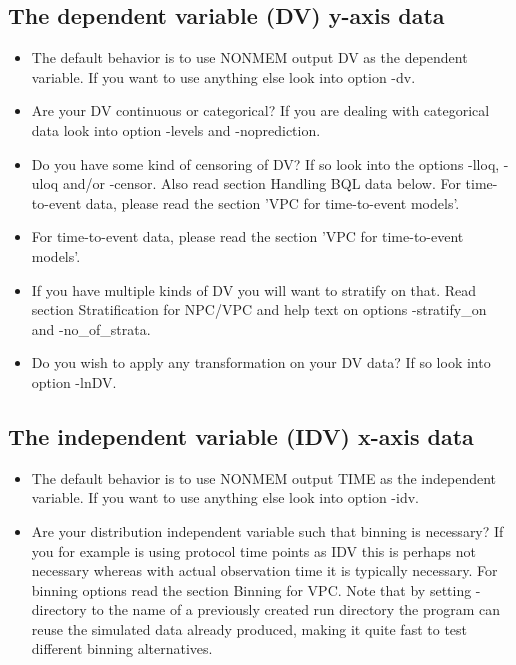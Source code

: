 \subsection{The dependent variable (DV) y-axis data}

\begin{itemize}
	\item The default behavior is to use NONMEM output DV as the dependent variable. If you want to use anything else look into option -dv.
	\item Are your DV continuous or categorical? If you are dealing with categorical data look into option -levels and -noprediction.
	\item Do you have some kind of censoring of DV? If so look into the options -lloq, -uloq and/or -censor. Also read section Handling BQL data below. For time-to-event data, please read the section 'VPC for time-to-event models'.
	\item For time-to-event data, please read the section 'VPC for time-to-event models'.
	\item If you have multiple kinds of DV you will want to stratify on that. Read section Stratification for NPC/VPC and help text on options -stratify\_on and -no\_of\_strata.
	\item Do you wish to apply any transformation on your DV data? If so look into option -lnDV.
\end{itemize}

\subsection{The independent variable (IDV) x-axis data}

\begin{itemize}
\item The default behavior is to use NONMEM output TIME as the independent variable. If you want to use anything else look into option -idv.
\item Are your distribution independent variable such that binning is necessary? If you for example is using protocol time points as IDV this is perhaps not necessary whereas with actual observation time it is typically necessary. For binning options read the section Binning for VPC. Note that by setting -directory to the name of a previously created run directory the program can reuse the simulated data already produced, making it quite fast to test different binning alternatives.
\end{itemize}

